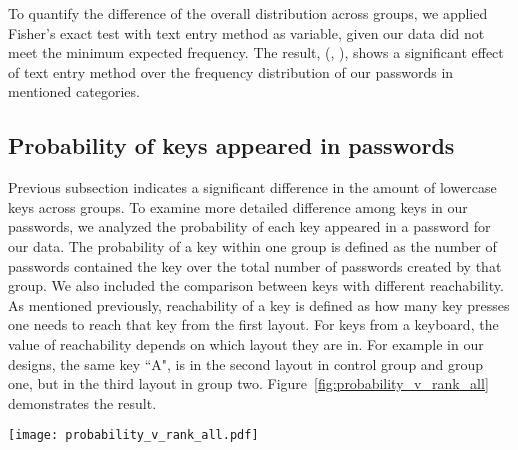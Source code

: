 \documentclass[conference]{IEEEtran}
\begin{document}
To quantify the difference of the overall distribution across groups, we applied Fisher's exact test with text entry method as variable, given our data did not meet the minimum expected frequency. The result, (, ), shows a significant effect of text entry method over the frequency distribution of our passwords in mentioned categories. 



\subsection{Probability of keys appeared in passwords}

Previous subsection indicates a significant difference in the amount of lowercase keys across groups. To examine more detailed difference among keys in our passwords, we analyzed the probability of each key appeared in a password for our data. The probability of a key within one group is defined as the number of passwords contained the key over the total number of passwords created by that group. We also included the comparison between keys with different reachability. As mentioned previously, reachability of a key is defined as how many key presses one needs to reach that key from the first layout. For keys from a keyboard, the value of reachability depends on which layout they are in. For example in our designs, the same key ``A", is in the second layout in control group and group one, but in the third layout in group two. Figure~\ref{fig:probability_v_rank_all} demonstrates the result. 

\begin{figure*}[htbp]
\begin{center}
\texttt{[image: probability\_v\_rank\_all.pdf]}
\caption{\label{fig:probability_v_rank_all} The probabilities of keys across groups. Three graphs display the same set of data but use different group as \emph{baseline group}: control group (top), group one (middle), group two (bottom). In each graph, probability of each key across groups are plotted as dots. Vertical lines indicate the order of layouts (first, second, etc) based on that of \emph{baseline group}. Within each layout, the order of keys on x axis is ranked by probability of each key from the corresponding \emph{baseline group} Curve lines in each graph represents a non-linear fit to data of each group.} 
\vspace{-9pt}
\end{center}
\end{figure*}
\end{document}
